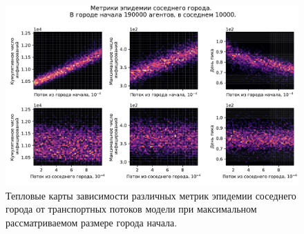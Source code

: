 \documentclass[a4paper,12pt]{article} %
\begin{document}

\begin{figure}[H]
    \centering
    \includegraphics[width=0.9\linewidth]{images/bignsmall_190000_1.pdf}
    \caption{Тепловые карты зависимости различных метрик эпидемии соседнего города от транспортных потоков модели при максимальном рассматриваемом размере города начала.}
    \label{pic:bignsmall_190000_1}
\end{figure}
\end{document}
